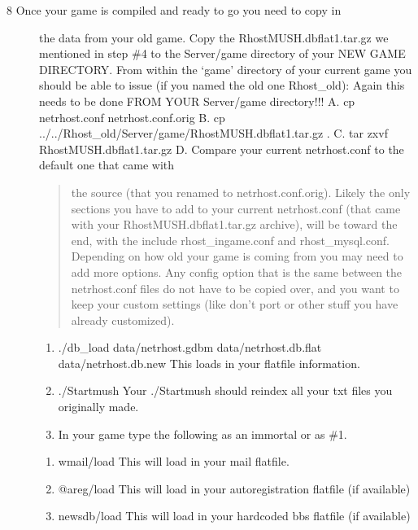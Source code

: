 \documentclass[letterpaper,10pt,english]{sphinxmanual}
\begin{document}
\begin{description}
\item[{8   Once your game is compiled and ready to go you need to copy in}] \leavevmode
\sphinxAtStartPar
the data from your old game.  Copy the RhostMUSH.dbflat1.tar.gz
we mentioned in step \#4 to the Server/game directory of your NEW
GAME DIRECTORY.  From within the ‘game’ directory of your current
game you should be able to issue (if you named the old one Rhost\_old):
Again this needs to be done FROM YOUR Server/game directory!!!
A. cp netrhost.conf netrhost.conf.orig
B. cp ../../Rhost\_old/Server/game/RhostMUSH.dbflat1.tar.gz .
C. tar \sphinxhyphen{}zxvf RhostMUSH.dbflat1.tar.gz
D. Compare your current netrhost.conf to the default one that came with
\begin{quote}

\sphinxAtStartPar
the source (that you renamed to netrhost.conf.orig).  Likely the
only sections you have to add to your current netrhost.conf (that
came with your RhostMUSH.dbflat1.tar.gz archive), will be toward
the end, with the include rhost\_ingame.conf and rhost\_mysql.conf.
Depending on how old your game is coming from you may need to add
more options.  Any config option that is the same between the
netrhost.conf files do not have to be copied over, and you want to
keep your custom settings (like don’t port or other stuff you
have already customized).
\end{quote}
\begin{enumerate}
%
\setcounter{enumi}{4}
\item {} 
\sphinxAtStartPar
./db\_load data/netrhost.gdbm data/netrhost.db.flat data/netrhost.db.new
This loads in your flatfile information.

\item {} 
\sphinxAtStartPar
./Startmush
Your ./Startmush should re\sphinxhyphen{}index all your txt files you originally made.

\item {} 
\sphinxAtStartPar
In your game type the following as an immortal or as \#1.

\end{enumerate}
\begin{enumerate}
%
\item {} 
\sphinxAtStartPar
wmail/load
This will load in your mail flatfile.

\item {} 
\sphinxAtStartPar
@areg/load
This will load in your autoregistration flatfile (if available)

\item {} 
\sphinxAtStartPar
newsdb/load
This will load in your hardcoded bbs flatfile (if available)

\end{enumerate}

\end{description}
\end{document}

